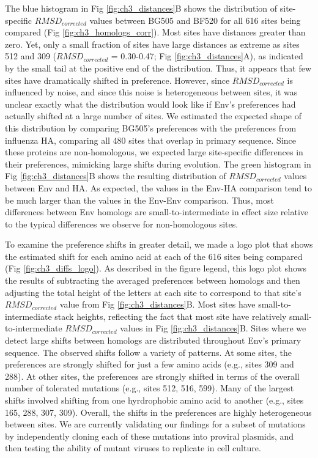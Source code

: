 \documentclass[9pt]{elife}
\begin{document}
The blue histogram in Fig \ref{fig:ch3_distances}B shows the distribution of site-specific $RMSD_{corrected}$ values between BG505 and BF520 for all 616 sites being compared (Fig \ref{fig:ch3_homologs_corr}).
Most sites have distances greater than zero.
Yet, only a small fraction of sites have large distances as extreme as sites 512 and 309 ($RMSD_{corrected}$ = 0.30-0.47; Fig \ref{fig:ch3_distances}A), as indicated by the small tail at the positive end of the distribution.
Thus, it appears that few sites have dramatically shifted in preference.
However, since $RMSD_{corrected}$ is influenced by noise, and since this noise is heterogeneous between sites, it was unclear exactly what the distribution would look like if Env's preferences had actually shifted at a large number of sites.
We estimated the expected shape of this distribution by comparing BG505's preferences with the preferences from influenza HA, comparing all 480 sites that overlap in primary sequence.
Since these proteins are non-homologous, we expected large site-specific differences in their preferences, mimicking large shifts during evolution.
The green histogram in Fig \ref{fig:ch3_distances}B shows the resulting distribution of $RMSD_{corrected}$ values between Env and HA.
As expected, the values in the Env-HA comparison tend to be much larger than the values in the Env-Env comparison.
Thus, most differences between Env homologs are small-to-intermediate in effect size relative to the typical differences we observe for non-homologous sites.

To examine the preference shifts in greater detail, we made a logo plot that shows the estimated shift for each amino acid at each of the 616 sites being compared (Fig \ref{fig:ch3_diffs_logo}).
As described in the figure legend, this logo plot shows the results of subtracting the averaged preferences between homologs and then adjusting the total height of the letters at each site to correspond to that site's $RMSD_{corrected}$ value from Fig \ref{fig:ch3_distances}B.
Most sites have small-to-intermediate stack heights, reflecting the fact that most site have relatively small-to-intermediate $RMSD_{corrected}$ values in Fig \ref{fig:ch3_distances}B.
Sites where we detect large shifts between homologs are distributed throughout Env's primary sequence.
The observed shifts follow a variety of patterns.
At some sites, the preferences are strongly shifted for just a few amino acids (e.g., sites 309 and 288).
At other sites, the preferences are strongly shifted in terms of the overall number of tolerated mutations (e.g., sites 512, 516, 599).
Many of the largest shifts involved shifting from one hyrdrophobic amino acid to another (e.g., sites 165, 288, 307, 309).
Overall, the shifts in the preferences are highly heterogeneous between sites.
We are currently validating our findings for a subset of mutations by independently cloning each of these mutations into proviral plasmids, and then testing the ability of mutant viruses to replicate in cell culture.
\end{document}
